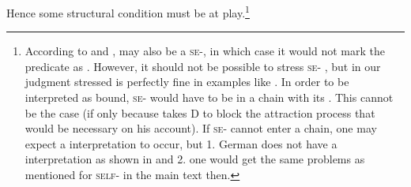 \documentclass[output=paper,colorlinks,citecolor=brown]{langscibook}
\begin{document}
Hence some structural condition must be at play.\footnote{According to \textcite{reuland_pronouns_1995} and \textcite{reuland_2011},  may also be a \textsc{se}-, in which case it would not mark the predicate as . However, it should not be possible to stress \textsc{se}- \parencites[see][249\psqq]{reuland_pronouns_1995}[][275\psqq]{reuland_2011}, but in our judgment stressed  is perfectly fine in examples like . In order to be interpreted as bound, \textsc{se}- would have to be in a chain with its . This cannot be the case (if only because \textcite[167\psqq]{reuland_2011} takes D to block the attraction process that would be necessary on his account). If \textsc{se}- cannot enter a chain, one may expect a  interpretation to occur, but 1. German  does not have a  interpretation as shown in  and 2. one would get the same problems as mentioned for \textsc{self}- in the main text then.}
\end{document}
